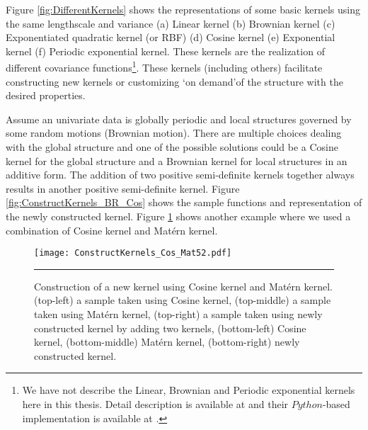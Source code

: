 Figure \ref{fig:DifferentKernels} shows the representations of some basic kernels using the same lengthscale and variance (a) Linear kernel (b) Brownian kernel (c) Exponentiated quadratic kernel (or RBF) (d) Cosine kernel (e) Exponential kernel (f) Periodic exponential kernel. These kernels are the realization of different covariance functions\footnote{We have not describe the Linear, Brownian and Periodic exponential kernels here in this thesis. Detail description is available at \cite{Rasmussen_and_Williams:2006} and their $Python$-based implementation is available at \cite{gpy2014}.}. These kernels (including others) facilitate constructing new kernels or customizing \lq on demand\rq of the structure with the desired properties. 

Assume an univariate data is globally periodic and local structures governed by some random motions (Brownian motion). There are multiple choices dealing with the global structure and one of the possible solutions could be a Cosine kernel for the global structure and a Brownian kernel for local structures in an additive form. The addition of two positive semi-definite kernels together always results in another positive semi-definite kernel. Figure \ref{fig:ConstructKernels_BR_Cos} shows the sample functions and representation of the newly constructed kernel. Figure \ref{fig:ConstructKernels2} shows another example where we used a combination of Cosine kernel and Mat{\'e}rn kernel.

\begin{figure}[t]
	\centering
		\texttt{[image: ConstructKernels\_Cos\_Mat52.pdf]}
		\rule{35em}{0.5pt}
	\caption[Construction of a new kernel using Cosine kernel and Mat{\'e}rn kernel]
		{Construction of a new kernel using Cosine kernel and Mat{\'e}rn kernel. (top-left) a sample taken using Cosine kernel, (top-middle) a sample taken using Mat{\'e}rn kernel, (top-right) a sample taken using newly constructed kernel by adding two kernels, (bottom-left) Cosine kernel, (bottom-middle) Mat{\'e}rn kernel, (bottom-right) newly constructed kernel.}
	\label{fig:ConstructKernels2}
\end{figure}


